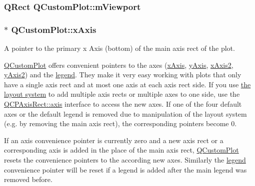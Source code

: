 \subsubsection[{\texorpdfstring{m\+Viewport}{mViewport}}]{\setlength{\rightskip}{0pt plus 5cm}Q\+Rect Q\+Custom\+Plot\+::m\+Viewport\hspace{0.3cm}{\ttfamily [protected]}}\hypertarget{class_q_custom_plot_ac0a7c38a715526c257cff95774f83ab6}{}\label{class_q_custom_plot_ac0a7c38a715526c257cff95774f83ab6}
\subsubsection[{\texorpdfstring{x\+Axis}{xAxis}}]{ $\ast$ Q\+Custom\+Plot\+::x\+Axis}\hypertarget{class_q_custom_plot_a9a79cd0158a4c7f30cbc702f0fd800e4}{}\label{class_q_custom_plot_a9a79cd0158a4c7f30cbc702f0fd800e4}
A pointer to the primary x Axis (bottom) of the main axis rect of the plot.

\hyperlink{class_q_custom_plot}{Q\+Custom\+Plot} offers convenient pointers to the axes (\hyperlink{class_q_custom_plot_a9a79cd0158a4c7f30cbc702f0fd800e4}{x\+Axis}, \hyperlink{class_q_custom_plot_af6fea5679725b152c14facd920b19367}{y\+Axis}, \hyperlink{class_q_custom_plot_ada41599f22cad901c030f3dcbdd82fd9}{x\+Axis2}, \hyperlink{class_q_custom_plot_af13fdc5bce7d0fabd640f13ba805c0b7}{y\+Axis2}) and the \hyperlink{class_q_custom_plot_a4eadcd237dc6a09938b68b16877fa6af}{legend}. They make it very easy working with plots that only have a single axis rect and at most one axis at each axis rect side. If you use \hyperlink{}{the layout system} to add multiple axis rects or multiple axes to one side, use the \hyperlink{class_q_c_p_axis_rect_a560de44e47a4af0f86c59102a094b1e4}{Q\+C\+P\+Axis\+Rect\+::axis} interface to access the new axes. If one of the four default axes or the default legend is removed due to manipulation of the layout system (e.\+g. by removing the main axis rect), the corresponding pointers become 0.

If an axis convenience pointer is currently zero and a new axis rect or a corresponding axis is added in the place of the main axis rect, \hyperlink{class_q_custom_plot}{Q\+Custom\+Plot} resets the convenience pointers to the according new axes. Similarly the \hyperlink{class_q_custom_plot_a4eadcd237dc6a09938b68b16877fa6af}{legend} convenience pointer will be reset if a legend is added after the main legend was removed before. 

